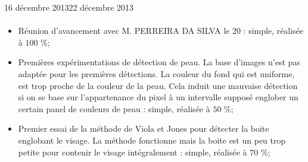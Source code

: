 \documentclass[11pt, french]{report-rd-info}
\begin{document}
\begin{fichesuivi}{16 décembre 2013}{22 décembre 2013}
\paragraph{}
	\begin{travaileffectue}
		\begin{itemize}
			\item Réunion d'avancement avec M. PERREIRA DA SILVA le 20 : simple, réalisée à $100$ \%;
			\item Premières expérimentations de détection de peau. La base d'images n'est pas adaptée pour les premières détections. La couleur du fond qui est uniforme, est trop proche de la couleur de la peau. Cela induit une mauvaise détection si on se base sur l'appartenance du pixel à un intervalle supposé englober un certain panel de couleurs de peau : simple, réalisée à $50$ \%;
			\item Premier essai de la méthode de Viola et Jones pour détecter la boite englobant le visage. La méthode fonctionne mais la boite est un peu trop petite pour contenir le visage intégralement : simple, réalisée à $70$ \%;
		\end{itemize}
	\end{travaileffectue}


\end{fichesuivi}
\end{document}
